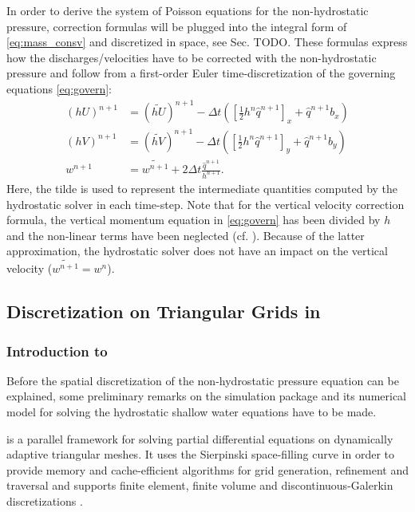 In order to derive the system of Poisson equations for the non-hydrostatic pressure, correction formulas will be plugged into the integral form of \eqref{eq:mass_consv} and discretized in space, see Sec. TODO. These formulas express how the discharges/velocities have to be corrected with the non-hydrostatic pressure and follow from a first-order Euler time-discretization of the governing equations \eqref{eq:govern}:
\begin{align}
(hU)^{n+1}&= (\widetilde{hU})^{n+1} -\Delta t \left(\left[\frac{1}{2}h^{n}\hat{q}^{n+1}\right]_x+\hat q^{n+1}b_x\right)
\\
(hV)^{n+1}&= (\widetilde{hV})^{n+1} -\Delta t \left(\left[\frac{1}{2}h^{n}\hat{q}^{n+1}\right]_y+\hat q^{n+1}b_y\right)
\\
w^{n+1}&= \widetilde{w^{n+1}}+ 2\Delta t \frac{\hat q^{n+1}}{h^{n+1}}.
\label{eq:correction}
\end{align}
Here, the tilde is used to represent the intermediate quantities computed by the hydrostatic solver in each time-step. Note that for the vertical velocity correction formula, the vertical momentum equation in  \eqref{eq:govern} has been divided by $h$ and the non-linear terms have been neglected (cf. \cite{cui}). Because of the latter approximation, the hydrostatic solver does not have an impact on the vertical velocity ($\widetilde{w^{n+1}}=w^{n}$). 





\subsection{Discretization on Triangular Grids in \samoa}

\subsubsection*{Introduction to \samoa}
Before the spatial discretization of the non-hydrostatic pressure equation can be explained, some preliminary remarks on the simulation package \samoa and its numerical model for solving the hydrostatic shallow water equations have to be made.

\samoa is a parallel framework for solving partial differential equations on dynamically adaptive triangular meshes. It uses the Sierpinski space-filling curve in order to provide memory and cache-efficient algorithms for grid generation, refinement and traversal and supports finite element, finite volume and discontinuous-Galerkin discretizations \cite{meister11software}.  

